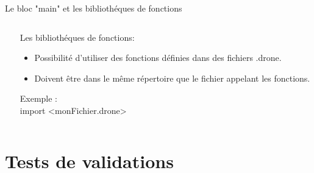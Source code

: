 \documentclass{bredelebeamer}
\begin{document}
\begin{frame}{Le bloc "main" et les bibliothéques de fonctions}
\begin{columns}
\begin{column}{0.5\textwidth}
\begin{tabbing}
\end{tabbing}	
\end{column}
\begin{column}{0.5\textwidth}
Les bibliothéques de fonctions:\\
\begin{itemize}
\item Possibilité d'utiliser des fonctions définies dans des fichiers .drone.
\item Doivent être dans le même répertoire que le fichier appelant les fonctions.
\end{itemize}\pause
\begin{tabbing}
Exemple :\=\\
            \>\color{Framarouge}import <\color{black}monFichier.drone\color{Framarouge}>
\end{tabbing}		
\vspace{90px}
\end{column}
\end{columns}

\end{frame}

\section{Tests de validations}
\end{document}
